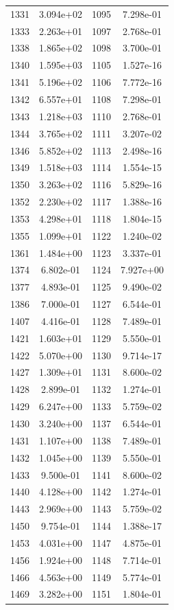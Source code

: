 \documentclass[12pt]{article}
\begin{document}
\begin{longtable}{@{}cccc@{}}
1331 & 3.094e+02 & 1095 & 7.298e-01 \\
1333 & 2.263e+01 & 1097 & 2.768e-01 \\
1338 & 1.865e+02 & 1098 & 3.700e-01 \\
1340 & 1.595e+03 & 1105 & 1.527e-16 \\
1341 & 5.196e+02 & 1106 & 7.772e-16 \\
1342 & 6.557e+01 & 1108 & 7.298e-01 \\
1343 & 1.218e+03 & 1110 & 2.768e-01 \\
1344 & 3.765e+02 & 1111 & 3.207e-02 \\
1346 & 5.852e+02 & 1113 & 2.498e-16 \\
1349 & 1.518e+03 & 1114 & 1.554e-15 \\
1350 & 3.263e+02 & 1116 & 5.829e-16 \\
1352 & 2.230e+02 & 1117 & 1.388e-16 \\
1353 & 4.298e+01 & 1118 & 1.804e-15 \\
1355 & 1.099e+01 & 1122 & 1.240e-02 \\
1361 & 1.484e+00 & 1123 & 3.337e-01 \\
1374 & 6.802e-01 & 1124 & 7.927e+00 \\
1377 & 4.893e-01 & 1125 & 9.490e-02 \\
1386 & 7.000e-01 & 1127 & 6.544e-01 \\
1407 & 4.416e-01 & 1128 & 7.489e-01 \\
1421 & 1.603e+01 & 1129 & 5.550e-01 \\
1422 & 5.070e+00 & 1130 & 9.714e-17 \\
1427 & 1.309e+01 & 1131 & 8.600e-02 \\
1428 & 2.899e-01 & 1132 & 1.274e-01 \\
1429 & 6.247e+00 & 1133 & 5.759e-02 \\
1430 & 3.240e+00 & 1137 & 6.544e-01 \\
1431 & 1.107e+00 & 1138 & 7.489e-01 \\
1432 & 1.045e+00 & 1139 & 5.550e-01 \\
1433 & 9.500e-01 & 1141 & 8.600e-02 \\
1440 & 4.128e+00 & 1142 & 1.274e-01 \\
1443 & 2.969e+00 & 1143 & 5.759e-02 \\
1450 & 9.754e-01 & 1144 & 1.388e-17 \\
1453 & 4.031e+00 & 1147 & 4.875e-01 \\
1456 & 1.924e+00 & 1148 & 7.714e-01 \\
1466 & 4.563e+00 & 1149 & 5.774e-01 \\
1469 & 3.282e+00 & 1151 & 1.804e-01 \\

\bottomrule
\end{longtable}
\end{document}
